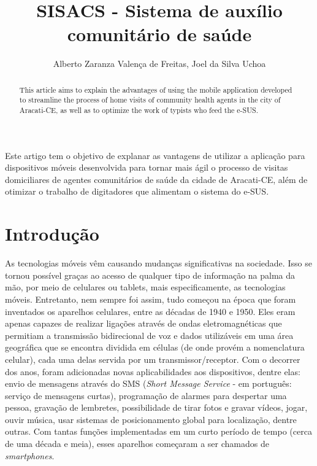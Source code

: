 \documentclass[12pt]{article}
\title{SISACS - Sistema de auxílio comunitário de saúde}
\author{Alberto Zaranza Valença de Freitas\inst{1}, Joel da Silva Uchoa\inst{1}}
\begin{document}
 

\maketitle

\begin{abstract}
    This article aims to explain the advantages of using the mobile application developed to streamline the process of home visits of community health agents in the city of Aracati-CE, as well as to optimize the work of typists who feed the e-SUS.
\end{abstract}
     
\begin{resumo} 
  Este artigo tem o objetivo de explanar as vantagens de utilizar a aplicação para dispositivos móveis desenvolvida para tornar mais ágil o processo de visitas domiciliares de agentes comunitários de saúde da cidade de Aracati-CE, além de otimizar o trabalho de digitadores que alimentam o sistema do e-SUS.
\end{resumo}


\section{Introdução}

As tecnologias móveis vêm causando mudanças significativas na sociedade. Isso se tornou possível graças ao acesso de qualquer tipo de informação na palma da mão, por meio de celulares ou tablets, mais especificamente, as tecnologias móveis. Entretanto, nem sempre foi assim, tudo começou na época que foram inventados os aparelhos celulares, entre as décadas de 1940 e 1950. Eles eram apenas capazes de realizar ligações através de ondas eletromagnéticas que permitiam a transmissão bidirecional de voz e dados utilizáveis em uma área geográfica que se encontra dividida em células (de onde provém a nomenclatura celular), cada uma delas servida por um transmissor/receptor. Com o decorrer dos anos, foram adicionadas novas aplicabilidades aos dispositivos, dentre elas: envio de mensagens através do SMS (\textit{Short Message Service} - em português: serviço de mensagens curtas), programação de alarmes para despertar uma pessoa, gravação de lembretes, possibilidade de tirar fotos e gravar vídeos,  jogar, ouvir música, usar sistemas de posicionamento global para localização, dentre outras. Com tantas funções implementadas em um curto período de tempo (cerca de uma década e meia), esses aparelhos começaram a ser chamados de \textit{smartphones}.
\end{document}

